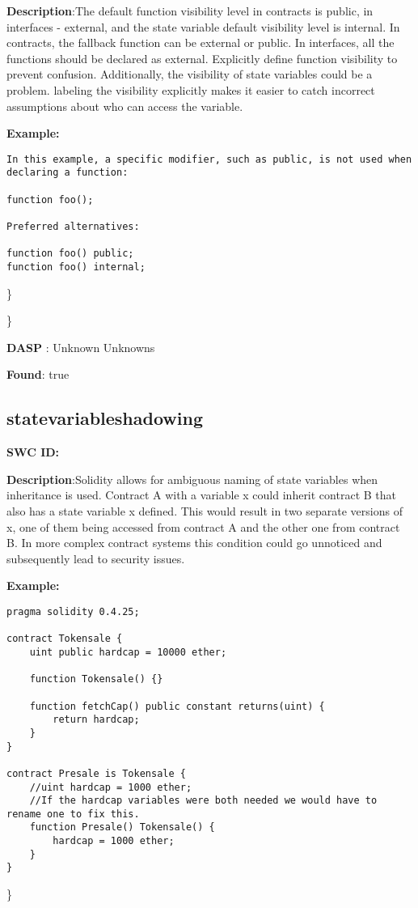 \documentclass{article}
\begin{document}
\textbf{Description}:The default function visibility level in contracts is public, in interfaces - external,  and the state variable default visibility level is internal. In contracts, the fallback function can be external or public. In interfaces, all the functions should be declared as external. Explicitly define function visibility to prevent confusion.
Additionally, the visibility of state variables could be a problem. labeling the visibility explicitly makes it easier to catch incorrect assumptions about who can access the variable.


\textbf{Example:} 
\begin{verbatim}
In this example, a specific modifier, such as public, is not used when declaring a function:

function foo();

Preferred alternatives:

function foo() public;
function foo() internal;

\end{verbatim}\} 

\} 

\textbf{DASP} : Unknown Unknowns

\textbf{Found}: true

\subsection{state\textunderscore variable\textunderscore shadowing} 
\textbf{SWC \textunderscore ID:} 

\textbf{Description}:Solidity allows for ambiguous naming of state variables when inheritance is used. Contract A with a variable x could inherit contract B that also has a state variable x defined. This would result in two separate versions of x, one of them being accessed from contract A and the other one from contract B. In more complex contract systems this condition could go unnoticed and subsequently lead to security issues.


\textbf{Example:} 
\begin{verbatim}
pragma solidity 0.4.25;

contract Tokensale {
    uint public hardcap = 10000 ether;

    function Tokensale() {}

    function fetchCap() public constant returns(uint) {
        return hardcap;
    }
}

contract Presale is Tokensale {
    //uint hardcap = 1000 ether;
    //If the hardcap variables were both needed we would have to rename one to fix this.
    function Presale() Tokensale() {
        hardcap = 1000 ether;
    }
}

\end{verbatim}\} 
\end{document}
